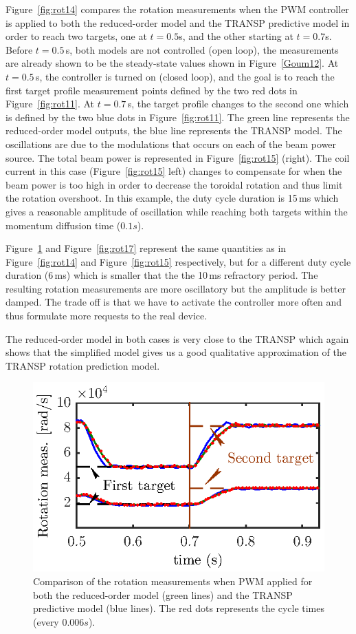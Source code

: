 \documentclass{iopart}
\begin{document}
Figure~\ref{fig:rot14} compares the rotation measurements when the PWM controller is applied to both the reduced-order model and the TRANSP predictive model in order to reach two targets, one at $t = 0.5$s, and the other starting at $t=0.7$s.
Before $t=0.5$\,s, both models are not controlled (open loop), the measurements are already shown to be the steady-state values shown in Figure~\ref{Goum12}.
At $t = 0.5$\,s, the controller is turned on (closed loop), and the goal is to reach the first target profile measurement points defined by the two red dots in Figure~\ref{fig:rot11}. At $t = 0.7$\,s, the  target profile changes to the second one which is defined by the two blue dots in Figure~\ref{fig:rot11}.
The green line represents the reduced-order model outputs, the blue line represents the TRANSP model. The oscillations are due to the modulations that occurs on each of the beam power source. The total beam power is represented in Figure~\ref{fig:rot15} (right). The coil current in this case (Figure~\ref{fig:rot15} left) changes to compensate for when the beam power is too high in order to decrease the toroidal rotation and thus limit the rotation overshoot.
In this example, the duty cycle duration is 15\,ms which gives a reasonable amplitude of oscillation while reaching both targets within the momentum diffusion time ($0.1 s$).

Figure~\ref{fig:rot16} and Figure~\ref{fig:rot17} represent the same quantities as in Figure~\ref{fig:rot14} and Figure~\ref{fig:rot15} respectively, but for a different duty cycle duration (6\,ms) which is smaller that the the 10\,ms refractory period.
The resulting rotation measurements are more oscillatory but the amplitude is better damped. The trade off is that we have to activate the controller more often and thus formulate more requests to the real device.

The reduced-order model in both cases is very close to the TRANSP which again shows that the simplified model gives us a good qualitative approximation of the TRANSP rotation prediction model.

\begin{figure}
	\centering
	\includegraphics{imene_figs/fig18} %
	\caption{Comparison of the rotation measurements when PWM applied for both the reduced-order model (green lines) and the TRANSP predictive model (blue lines). The red dots represents the cycle times (every $0.006 s$).}
	\label{fig:rot16}
\end{figure}
\end{document}
